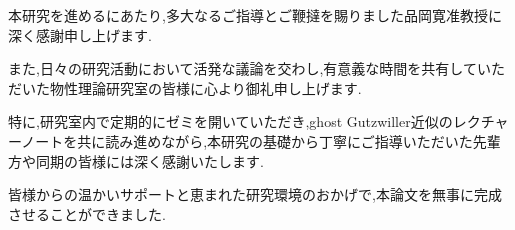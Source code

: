 
本研究を進めるにあたり,多大なるご指導とご鞭撻を賜りました品岡寛准教授に深く感謝申し上げます.

また,日々の研究活動において活発な議論を交わし,有意義な時間を共有していただいた物性理論研究室の皆様に心より御礼申し上げます.

特に,研究室内で定期的にゼミを開いていただき,ghost Gutzwiller近似のレクチャーノートを共に読み進めながら,本研究の基礎から丁寧にご指導いただいた先輩方や同期の皆様には深く感謝いたします.

皆様からの温かいサポートと恵まれた研究環境のおかげで,本論文を無事に完成させることができました.

